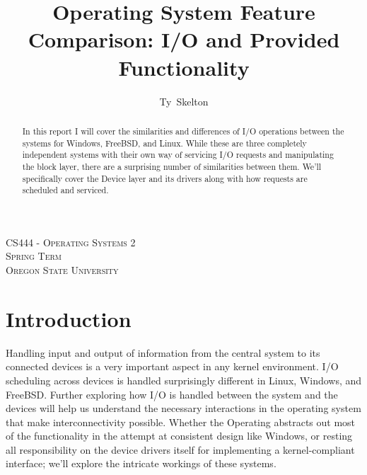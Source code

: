 \documentclass[10pt,draftclsnofoot,onecolumn]{IEEEtran}
\begin{document}
\singlespacing
\title{Operating System Feature Comparison: I/O and Provided Functionality}

\author{Ty~Skelton}

\maketitle

\begin{abstract}
In this report I will cover the similarities and differences of I/O operations between the systems for Windows, FreeBSD, and Linux.
While these are three completely independent systems with their own way of servicing I/O requests and manipulating the block layer, there are a surprising number of similarities between them.
We'll specifically cover the Device layer and its drivers along with how requests are scheduled and serviced.
\end{abstract}

\begin{center}
\scshape %
CS444 - Operating Systems 2 \\  %
Spring Term\\[\baselineskip]    %
Oregon State University\par     %
\end{center}

\IEEEpeerreviewmaketitle

\newpage
{}
\tableofcontents
\newpage

\section{Introduction}
Handling input and output of information from the central system to its connected devices is a very important aspect in any kernel environment.
I/O scheduling across devices is handled surprisingly different in Linux, Windows, and FreeBSD.
Further exploring how I/O is handled between the system and the devices will help us understand the necessary interactions in the operating system that make interconnectivity possible.
Whether the Operating abstracts out most of the functionality in the attempt at consistent design like Windows, or resting all responsibility on the device drivers itself for implementing a kernel-compliant interface; we'll explore the intricate workings of these systems.

\end{document}
